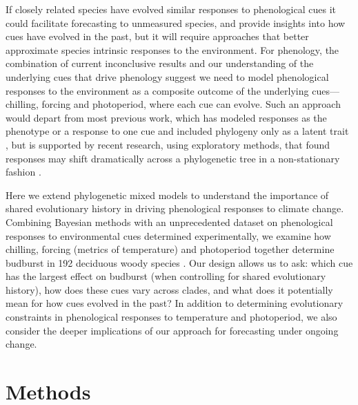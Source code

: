 \documentclass{article}\usepackage[]{graphicx}\usepackage[]{color}
\begin{document}
If closely related species have evolved similar responses to phenological cues it could facilitate forecasting to unmeasured species, and provide insights into how cues have evolved in the past, but it will require approaches that better approximate species intrinsic responses to the environment. For phenology, the combination of current inconclusive results and our understanding of the underlying cues that drive phenology suggest we need to model phenological responses to the environment as a composite outcome of the underlying cues---chilling, forcing and photoperiod, where each cue can evolve. Such an approach would depart from most previous work, which has modeled responses as the phenotype or a response to one cue and included phylogeny only as a latent trait \citep{XXXX}, but is supported by recent research, using exploratory methods, that found responses may shift dramatically across a phylogenetic tree in a non-stationary fashion \citep{davies2019phylogenetically}. 

Here we extend phylogenetic mixed models to understand the importance of shared evolutionary history in driving phenological responses to climate change. Combining Bayesian methods with an unprecedented dataset on phenological responses to environmental cues determined experimentally, we examine how chilling, forcing (metrics of temperature) and photoperiod together determine budburst in 192 deciduous woody species \cite[by far the most studied group of species in phenology experiments, see][]{ettinger2020}. Our design allows us to ask: which cue has the largest effect on budburst (when controlling for shared evolutionary history), how does these cues vary across clades, and what does it potentially mean for how cues evolved in the past? In addition to determining evolutionary constraints in phenological responses to temperature and photoperiod, we also consider the deeper implications of our approach for forecasting under ongoing change.



\clearpage


\section*{Methods}
\end{document}
